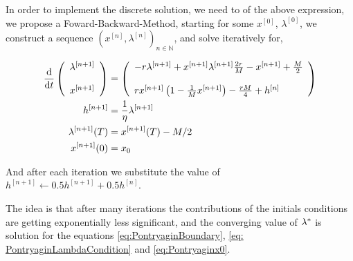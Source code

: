 In order to implement the discrete solution, we need to  of the above expression, we propose a Foward-Backward-Method, starting for some $x^{[0]}$, $\lambda^{[0]}$, we construct a sequence $\left(x^{[n]}, \lambda^{[n]}\right)_{n\in \mathbb{N}}$, and solve iteratively for,

\begin{align}
	\frac{\mathrm{d} }{{\mathrm{d} t}}\left(\begin{array}{l}
	\lambda^{[n+1]}\\\\x^{[n+1]}
	\end{array}\right)&= \left(\begin{array}{l}
	-r\lambda^{[n+1]}+x^{[n+1]}\lambda^{[n+1]} \frac{2r}{M}-x^{[n+1]}+\frac{M}{2}\\\\rx^{[n+1]}\left(1-\frac{1}{M}x^{[n+1]}\right)-\frac{rM}{4}+h^{[n]}
	\end{array}\right)\label{eq: FBS}\\ 
	h^{[n+1]}&=\frac{1}{\eta}\lambda^{[n+1]}\\
	\lambda^{[n+1]}(T)&=x^{[n+1]}(T)-M/2\label{eq: FBSBoundary}\\
	x^{[n+1]}(0)&=x_0 \\
\end{align}


And after each iteration we substitute the value of $h^{[n+1]}\leftarrow0.5h^{[n+1]}+0.5h^{[n]}$. 

The idea is that after many iterations the contributions of the initials conditions are getting exponentially less significant, and the converging value of ${\lambda}^{\ast}$ is solution for the equations \ref{eq:PontryaginBoundary}, \ref{eq: PontryaginLambdaCondition} and \ref{eq:Pontryaginx0}.

